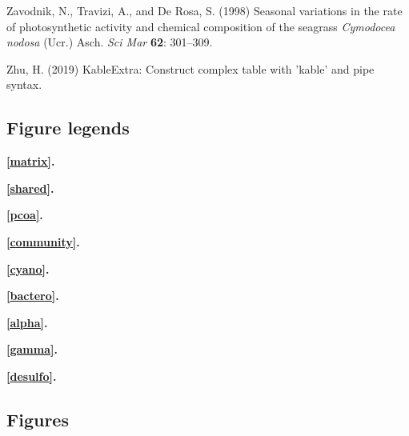 \documentclass[12pt,]{article}
\begin{document}
\leavevmode\hypertarget{ref-Zavodnik1998}{}%
Zavodnik, N., Travizi, A., and De Rosa, S. (1998) Seasonal variations in
the rate of photosynthetic activity and chemical composition of the
seagrass \emph{Cymodocea nodosa} (Ucr.) Asch. \emph{Sci Mar}
\textbf{62}: 301--309.

\leavevmode\hypertarget{ref-Zhu2019}{}%
Zhu, H. (2019) KableExtra: Construct complex table with 'kable' and pipe
syntax.

\newpage 
\setlength\parindent{0pt}

\hypertarget{figure-legends}{%
\subsection{Figure legends}\label{figure-legends}}

\textbf{\autoref{matrix}.} 

\textbf{\autoref{shared}.} 

\textbf{\autoref{pcoa}.} 

\textbf{\autoref{community}.} 

\textbf{\autoref{cyano}.} 

\textbf{\autoref{bactero}.} 

\textbf{\autoref{alpha}.} 

\textbf{\autoref{gamma}.} 

\textbf{\autoref{desulfo}.} 

\hypertarget{figures}{%
\subsection{Figures}\label{figures}}
\end{document}
